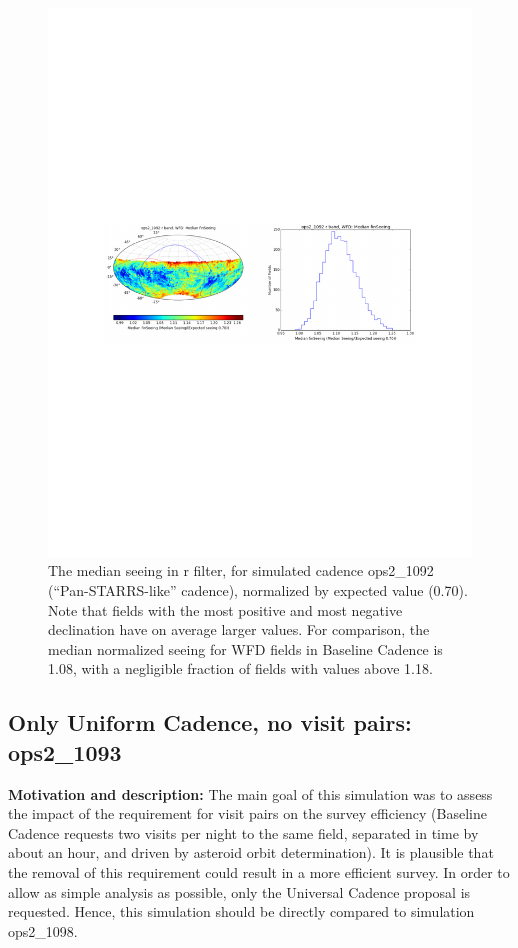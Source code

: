 \documentclass[manuscript]{article}
\begin{document}
\begin{figure}[t!]
\vskip -3.9in
\hskip -0.5in
\includegraphics[angle=0,width=1.19\hsize,clip]{PS-seeing.pdf}
\vskip -4.0in
\caption{The median seeing in r filter, for simulated cadence ops2\_1092 (``Pan-STARRS-like'' cadence), 
normalized by expected value (0.70). Note that fields with the most positive and most negative 
declination have on average larger values. For comparison, the median normalized seeing for WFD fields
in Baseline Cadence is 1.08, with a negligible fraction of fields with values above 1.18.} 
\label{fig:PS-seeing}
\end{figure}



\subsection{Only Uniform Cadence, no visit pairs: ops2\_1093} 

{\bf Motivation and description:} 
The main goal of this simulation was to assess the impact of the requirement for visit pairs on the 
survey efficiency (Baseline Cadence requests two visits per night to the same field, separated in time 
by about an hour, and driven by asteroid orbit determination). It is plausible that the removal
of this requirement could result in a more efficient survey. In order to allow as simple analysis
as possible, only the Universal Cadence proposal is requested. Hence, this simulation
should be directly compared to simulation ops2\_1098. \\
\end{document}
